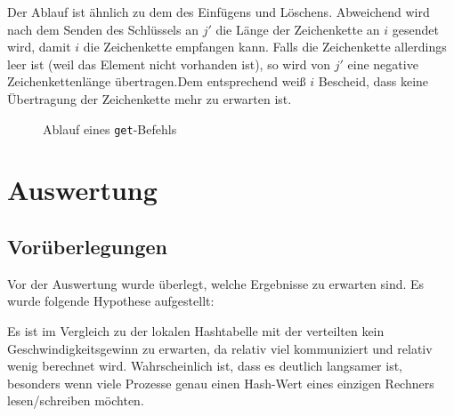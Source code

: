 \documentclass{scrreprt}
\begin{document}
Der Ablauf ist ähnlich zu dem des Einfügens und Löschens. Abweichend wird nach dem Senden des Schlüssels an $j'$ die Länge der Zeichenkette an $i$ gesendet wird, damit $i$ die Zeichenkette empfangen kann. Falls die Zeichenkette allerdings leer ist (weil das Element nicht vorhanden ist), so wird von $j'$ eine negative Zeichenkettenlänge übertragen.Dem entsprechend weiß $i$ Bescheid, dass keine Übertragung der Zeichenkette mehr zu erwarten ist.
\begin{figure}[!ht]
\centering
{}
\caption{Ablauf eines \lstinline`get`-Befehls}
\label{fig:disthashget}
\end{figure}

\chapter{Auswertung}

\section{Vorüberlegungen}
\label{sec:hyp}

Vor der Auswertung wurde überlegt, welche Ergebnisse zu erwarten sind. Es wurde folgende Hypothese aufgestellt:

Es ist im Vergleich zu der lokalen Hashtabelle mit der verteilten kein Geschwindigkeitsgewinn zu erwarten, da relativ viel kommuniziert und relativ wenig berechnet wird. Wahrscheinlich ist, dass es deutlich langsamer ist, besonders wenn viele Prozesse genau einen Hash-Wert eines einzigen Rechners lesen/schreiben möchten.
\end{document}
